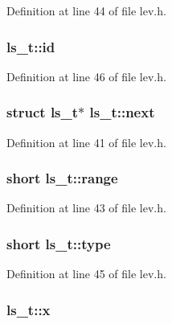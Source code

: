 Definition at line 44 of file lev.\+h.

\hypertarget{structls__t_a753045829e6881cd06534586d0550eb0}{
\subsubsection[{id}]{ ls\+\_\+t\+::id}}\label{structls__t_a753045829e6881cd06534586d0550eb0}


Definition at line 46 of file lev.\+h.

\hypertarget{structls__t_ac52e34ae00c6269acc4d7ee640fa661f}{
\subsubsection[{next}]{\setlength{\rightskip}{0pt plus 5cm}struct {\bf ls\+\_\+t}$\ast$ ls\+\_\+t\+::next}}\label{structls__t_ac52e34ae00c6269acc4d7ee640fa661f}


Definition at line 41 of file lev.\+h.

\hypertarget{structls__t_ac351f3076841b851b29b18fe28e28d2c}{
\subsubsection[{range}]{\setlength{\rightskip}{0pt plus 5cm}short ls\+\_\+t\+::range}}\label{structls__t_ac351f3076841b851b29b18fe28e28d2c}


Definition at line 43 of file lev.\+h.

\hypertarget{structls__t_a1b364e93c6bf8f2d4331a7353803c5fe}{
\subsubsection[{type}]{\setlength{\rightskip}{0pt plus 5cm}short ls\+\_\+t\+::type}}\label{structls__t_a1b364e93c6bf8f2d4331a7353803c5fe}


Definition at line 45 of file lev.\+h.

\hypertarget{structls__t_a6c4a6a0d261a4e9ef251c62b6bc5ccd7}{
\subsubsection[{x}]{ ls\+\_\+t\+::x}}\label{structls__t_a6c4a6a0d261a4e9ef251c62b6bc5ccd7}


